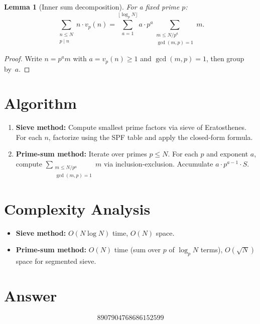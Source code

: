 \documentclass[12pt]{article}
\newtheorem{lemma}[theorem]{Lemma}
\begin{document}
\begin{lemma}[Inner sum decomposition]
For a fixed prime $p$:
\[
\sum_{\substack{n\le N\\p\mid n}} n\cdot v_p(n) = \sum_{a=1}^{\lfloor\log_p N\rfloor} a\cdot p^a \sum_{\substack{m\le N/p^a\\\gcd(m,p)=1}} m.
\]
\end{lemma}

\begin{proof}
Write $n = p^a m$ with $a=v_p(n)\ge 1$ and $\gcd(m,p)=1$, then group by~$a$.
\end{proof}

\section{Algorithm}
\begin{enumerate}
\item \textbf{Sieve method:} Compute smallest prime factors via sieve of Eratosthenes. For each $n$, factorize using the SPF table and apply the closed-form formula.
\item \textbf{Prime-sum method:} Iterate over primes $p\le N$. For each $p$ and exponent $a$, compute $\sum_{\substack{m\le N/p^a\\\gcd(m,p)=1}}m$ via inclusion-exclusion. Accumulate $a\cdot p^{a-1}\cdot S$.
\end{enumerate}

\section{Complexity Analysis}
\begin{itemize}
\item \textbf{Sieve method:} $O(N\log N)$ time, $O(N)$ space.
\item \textbf{Prime-sum method:} $O(N)$ time (sum over $p$ of $\log_p N$ terms), $O(\sqrt{N})$ space for segmented sieve.
\end{itemize}

\section{Answer}

\[
\boxed{8907904768686152599}
\]
\end{document}
